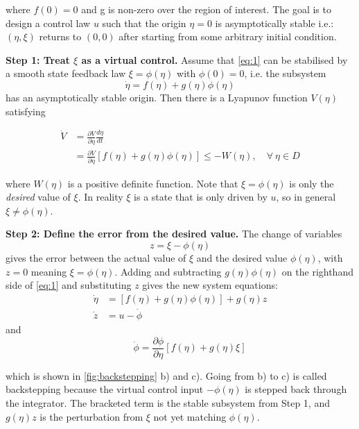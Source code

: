 where $f(0)=0$ and g is non-zero over the region of interest.
The goal is to design a control law $u$ such that the origin $\eta=0$ is asymptotically stable i.e.: $(\eta, \xi)$ returns to $(0,0)$ after starting from some arbitrary initial condition.

\textbf{Step 1: Treat $\xi$ as a virtual control.} Assume that \autoref{eq:1} can be stabilised by a smooth state feedback law $\xi=\phi(\eta)$ with $\phi(0)=0$, i.e. the subsystem
\begin{equation}
    \dot{\eta} = f(\eta) + g(\eta)\phi(\eta)
\end{equation}
has an asymptotically stable origin. Then there is a Lyapunov function $V(\eta)$ satisfying

\begin{equation}
\begin{split}
    \dot{V} &= \frac{\partial V}{\partial \eta}\frac{d \eta}{dt} \\
    &= \frac{\partial V}{\partial \eta}[f(\eta) + g(\eta)\phi(\eta)] \leq -W(\eta), \quad \forall \ \eta \in D
\end{split}
\end{equation}

where $W(\eta)$ is a positive definite function. Note that $\xi=\phi(\eta)$ is only the \textit{desired} value of $\xi$. In reality $\xi$ is a state that is only driven by $u$, so in general $\xi \neq \phi(\eta)$.

\textbf{Step 2: Define the error from the desired value.} The change of variables
$$ z = \xi - \phi(\eta) $$
gives the error between the actual value of $\xi$ and the desired value $\phi(\eta)$, with $z=0$ meaning $\xi=\phi(\eta)$. Adding and subtracting $g(\eta)\phi(\eta)$ on the righthand side of \autoref{eq:1} and substituting $z$ gives the new system equations:
\begin{align}
    \dot{\eta} &= [f(\eta) + g(\eta)\phi(\eta)] + g(\eta)z \\
    \dot{z} &= u - \dot{\phi}
\end{align}
and 
\begin{equation}
\qquad \dot{\phi} = \frac{\partial \phi}{\partial \eta} [f(\eta) + g(\eta)\xi]
\end{equation}

which is shown in \autoref{fig:backstepping} b) and c). Going from b) to c) is called backstepping because the virtual control input $-\phi(\eta)$ is stepped back through the integrator. The bracketed term is the stable subsystem from Step 1, and $g(\eta)z$ is the perturbation from $\xi$ not yet matching $\phi(\eta)$.

